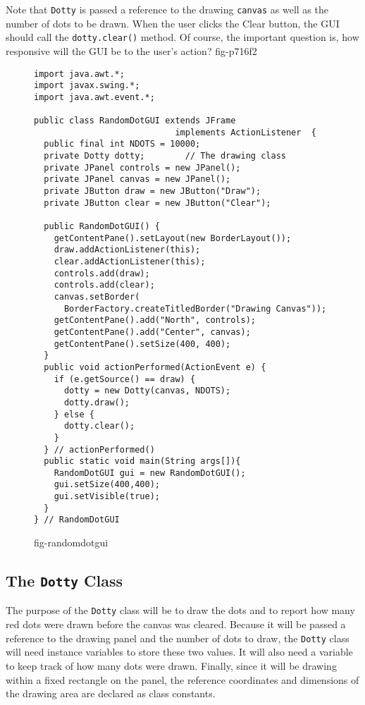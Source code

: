 \noindent Note that {\tt Dotty} is passed a reference to the drawing
{\tt canvas} as well as the number of dots to be drawn.   When the user
clicks the Clear button, the GUI should call the {\tt dotty.clear()}
method.  Of course, the important question is, how responsive will
the GUI be to the user's action?
{fig-p716f2}



\begin{figure}[h!]
\jjjprogstart
\begin{jjjlisting}
\begin{lstlisting}
import java.awt.*;
import javax.swing.*;
import java.awt.event.*;

public class RandomDotGUI extends JFrame 
                            implements ActionListener  {
  public final int NDOTS = 10000;
  private Dotty dotty;        // The drawing class
  private JPanel controls = new JPanel();
  private JPanel canvas = new JPanel();
  private JButton draw = new JButton("Draw");
  private JButton clear = new JButton("Clear");
 	
  public RandomDotGUI() {
    getContentPane().setLayout(new BorderLayout());
    draw.addActionListener(this);
    clear.addActionListener(this);
    controls.add(draw);
    controls.add(clear);
    canvas.setBorder(
      BorderFactory.createTitledBorder("Drawing Canvas"));
    getContentPane().add("North", controls);
    getContentPane().add("Center", canvas);
    getContentPane().setSize(400, 400);
  } 
  public void actionPerformed(ActionEvent e) {
    if (e.getSource() == draw) {
      dotty = new Dotty(canvas, NDOTS);
      dotty.draw();
    } else {
      dotty.clear();
    }
  } // actionPerformed()
  public static void main(String args[]){
    RandomDotGUI gui = new RandomDotGUI();
    gui.setSize(400,400);
    gui.setVisible(true);        
  }
} // RandomDotGUI
\end{lstlisting}
\end{jjjlisting}
{fig-randomdotgui}
\end{figure}

\subsection*{The {\tt Dotty} Class}

\noindent The purpose of the {\tt Dotty} class will be to draw the
dots and to report how many red dots were drawn before the canvas was
cleared.  Because it will be passed a reference to the drawing panel
and the number of dots to draw, the {\tt Dotty} class will need
instance variables to store these two values.  It will also need a
variable to keep track of how many
dots were drawn.  Finally, since it will be drawing within a fixed
rectangle on the panel, the reference coordinates and dimensions
of the drawing area are declared as class constants. 

